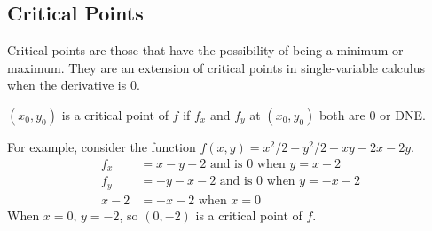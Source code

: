 \subsection{Critical Points}
\noindent
Critical points are those that have the possibility of being a minimum or maximum.
They are an extension of critical points in single-variable calculus when the derivative is 0.\\

\noindent
\begin{definition}
	$(x_0, y_0)$ is a critical point of $f$ if $f_x$ and $f_y$ at $(x_0, y_0)$ both are 0 or DNE.
\end{definition}

\noindent
For example, consider the function $f(x,y) = x^2/2 - y^2/2 - xy - 2x - 2y$.
\begin{align*}
	f_x &= x - y - 2	\text{ and is } 0 \text{ when } y = x-2 \\
	f_y &= -y - x - 2 \text{ and is } 0 \text{ when } y = -x-2 \\
	x - 2 &= -x -2 \text{ when } x = 0
\end{align*}
When $x = 0$, $ y =-2$, so $(0, -2)$ is a critical point of $f$.

